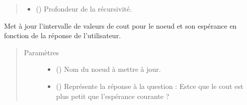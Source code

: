 \documentclass[letterpaper,10pt,french]{sphinxmanual}
\begin{document}
\begin{fulllineitems}
\begin{fulllineitems}
\begin{quote}
\begin{description}
\begin{itemize}
\item {} 
 (\sphinxstyleliteralemphasis{\sphinxupquote{, }}) \textendash{} Profondeur de la récursivité.

\end{itemize}

\end{description}\end{quote}

\end{fulllineitems}


\begin{fulllineitems}
\label{\detokenize{index:DecisionTheoreticTroubleshooting.TroubleShootingProblem.elicitation}}
Met à jour l’intervalle de valeurs de cout pour le noeud et son
espérance en fonction de la réponse de l’utilisateur.
\begin{quote}\begin{description}
\item[{Paramètres}] \leavevmode\begin{itemize}
\item {} 
 () \textendash{} Nom du noeud à mettre à jour.

\item {} 
 () \textendash{} Représente la réponse à la question : Est\sphinxhyphen{}ce que le cout est plus
petit que l’espérance courante ?

\end{itemize}

\end{description}\end{quote}

\end{fulllineitems}



\end{fulllineitems}
\end{document}

